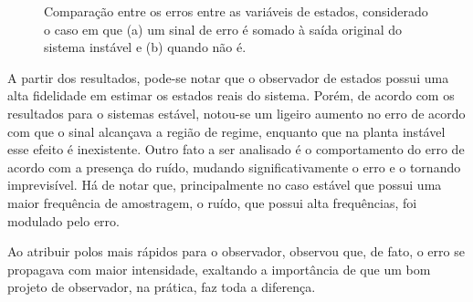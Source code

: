 \begin{figure}[H]
\begin{center}
\end{center}
\caption{Comparação entre os erros entre as variáveis de estados, considerado o caso em que (a) um sinal de erro é somado à saída original do sistema instável e (b) quando não é.}
\label{obs:ins:err} 
\end{figure}

A partir dos resultados, pode-se notar que o observador de estados possui uma alta fidelidade em estimar os estados reais do sistema. Porém, de acordo com os resultados para o sistemas estável, notou-se um ligeiro aumento no erro de acordo com que o sinal alcançava a região de regime, enquanto que na planta instável esse efeito é inexistente. Outro fato a ser analisado é o comportamento do erro de acordo com a presença do ruído, mudando significativamente o erro e o tornando imprevisível. Há de notar que, principalmente no caso estável que possui uma maior frequência de amostragem, o ruído, que possui alta frequências, foi modulado pelo erro.

Ao atribuir polos mais rápidos para o observador, observou que, de fato, o erro se propagava com maior intensidade, exaltando a importância de que um bom projeto de observador, na prática, faz toda a diferença.

\pagebreak
